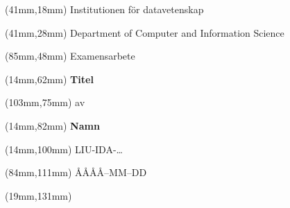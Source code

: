\documentclass[a4paper]{memoir}
\begin{document}
\pagestyle{empty}
\fontsize{29}{35pt}\selectfont
\begin{textblock*}{127mm}(41mm,18mm)
  Institutionen för datavetenskap
\end{textblock*}

\fontsize{18}{35pt}\selectfont
\begin{textblock*}{127mm}(41mm,28mm)
Department of Computer and Information Science
\end{textblock*}

\fontsize{18}{35pt}\selectfont
\begin{textblock*}{39mm}(85mm,48mm)
  Examensarbete
\end{textblock*}

\fontsize{24}{29pt}\selectfont
\begin{textblock*}{175mm}(14mm,62mm)
  \hspace*{\fill}\textbf{Titel}\hspace*{\fill}
\end{textblock*}

\fontsize{12}{14pt}\selectfont
\begin{textblock*}{4mm}(103mm,75mm)
  av
\end{textblock*}

\fontsize{24}{29pt}\selectfont
\begin{textblock*}{175mm}(14mm,82mm)
  \hspace*{\fill}\textbf{Namn}\hspace*{\fill}
\end{textblock*}


\fontsize{18}{22pt}\selectfont
\begin{textblock*}{175mm}(14mm,100mm)
  \hspace*{\fill}LIU-IDA-\ldots\hspace*{\fill}
\end{textblock*}

\fontsize{18}{22pt}\selectfont
\begin{textblock*}{46mm}(84mm,111mm)
  \hspace*{\fill}ÅÅÅÅ--MM--DD\hspace*{\fill}
\end{textblock*}


\begin{textblock*}{173mm}(19mm,131mm)
  \setlength{\fboxrule}{1mm}
  \thicklines
\end{textblock*}
\end{document}
